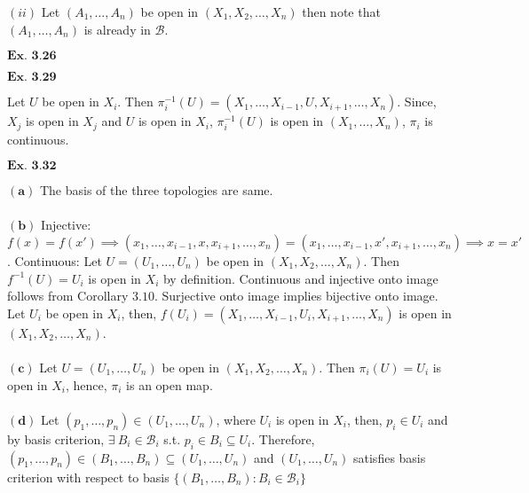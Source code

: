 \documentclass{article}
\begin{document}
$(ii)$ Let $(A_1, \ldots, A_n)$ be open in $(X_1, X_2 , \ldots , X_n)$ then note that $(A_1, \ldots, A_n)$ is already in $\mathcal{B}$.


\vspace{0.2in}

${\textbf{Ex. 3.26}}$


\vspace{0.2in}

${\textbf{Ex. 3.29}}$

Let $U$ be open in $X_i$. Then $\pi_i^{-1}(U) = (X_1, \ldots, X_{i-1}, U, X_{i+1}, \ldots, X_n)$. Since, $X_j$ is open in $X_j$ and $U$ is open in $X_i$, $\pi_i^{-1}(U)$ is open in $(X_1 , \ldots , X_n)$, $\pi_i$ is continuous.

\vspace{0.2in}

${\textbf{Ex. 3.32}}$

$\mathbf{(a)}$ The basis of the three topologies are same.\\~\\

$\mathbf{(b)}$ Injective: $f(x) = f(x') \implies (x_1,\ldots,x_{i-1},x,x_{i+1},\ldots,x_n) = (x_1,\ldots,x_{i-1},x',x_{i+1},\ldots,x_n) \implies x=x'$. Continuous: Let $U = (U_1,\ldots,U_n)$ be open in $(X_1,X_2,\ldots,X_n)$. Then $f^{-1}(U) = U_i$ is open in $X_i$ by definition. Continuous and injective onto image follows from Corollary $3.10$. Surjective onto image implies bijective onto image. Let $U_i$ be open in $X_i$, then, $f(U_i) = (X_1, \ldots, X_{i-1}, U_i, X_{i+1}, \ldots, X_{n})$ is open in $(X_1,X_2,\ldots,X_n)$.\\~\\

$\mathbf{(c)}$ Let $U = (U_1,\ldots,U_n)$ be open in $(X_1,X_2,\ldots,X_n)$. Then $\pi_{i}(U) = U_i$ is open in $X_i$, hence, $\pi_i$ is an open map.\\~\\

$\mathbf{(d)}$ Let $(p_1, \ldots, p_n) \in (U_1, \ldots, U_n)$, where $U_i$ is open in $X_i$, then, $p_i \in U_i$ and by basis criterion, $\exists\ B_i \in \mathcal{B}_i$ s.t. $p_i \in B_i \subseteq U_i$. Therefore, $(p_1, \ldots, p_n) \in (B_1, \ldots, B_n) \subseteq (U_1, \ldots, U_n)$ and $(U_1, \ldots, U_n)$ satisfies basis criterion with respect to basis $\{(B_1, \ldots, B_n): B_i \in \mathcal{B}_i\}$\\~\\
\end{document}

